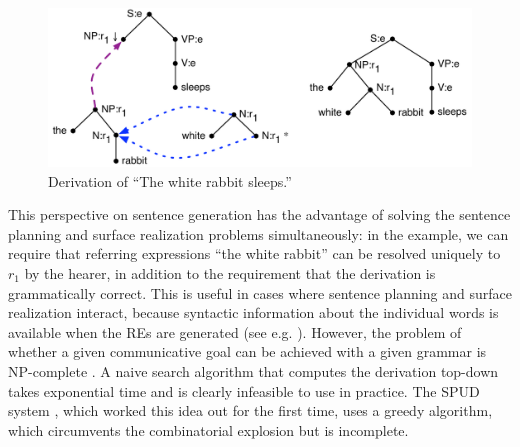 \begin{figure}
  \centering
  \includegraphics[width=0.75\columnwidth]{pic-derivation}
  \caption{Derivation of ``The white rabbit sleeps.''}
  \label{fig:white-rabbit-sleeps-deriv}
\end{figure}

This perspective on sentence generation has the advantage of solving
the sentence planning and surface realization problems simultaneously:
in the example, we can require that referring expressions ``the white
rabbit'' can be resolved uniquely to $r_1$ by the hearer, in addition
to the requirement that the derivation is grammatically correct. This
is useful in cases where sentence planning and surface realization
interact, because syntactic information about the individual words is
available when the REs are generated (see
e.g. \cite{stone98textual}). However, the problem of whether a given
communicative goal can be achieved with a given grammar is NP-complete
\cite{KolStr02}. A naive search algorithm that computes the derivation
top-down takes exponential time and is clearly infeasible to use in
practice. The SPUD system \cite{Stone2003a}, which worked this idea
out for the first time, uses a greedy algorithm, which circumvents the
combinatorial explosion but is incomplete.

